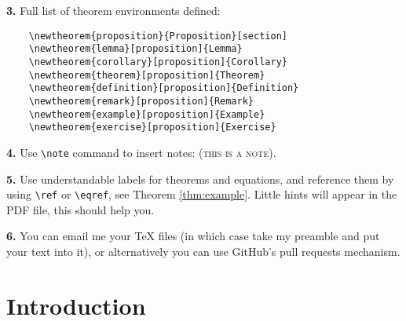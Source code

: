 \documentclass[letterpaper,11pt,oneside,reqno]{amsart}
\numberwithin{equation}{section}
\newcommand{\note}[1]{\textsc{\color{blue}(#1)}}
\theoremstyle{definition}
\begin{document}
\textbf{3.} Full list of theorem environments defined:
\begin{lstlisting}
	\newtheorem{proposition}{Proposition}[section]
	\newtheorem{lemma}[proposition]{Lemma}
	\newtheorem{corollary}[proposition]{Corollary}
	\newtheorem{theorem}[proposition]{Theorem}
	\newtheorem{definition}[proposition]{Definition}
	\newtheorem{remark}[proposition]{Remark}
	\newtheorem{example}[proposition]{Example}
	\newtheorem{exercise}[proposition]{Exercise}	
\end{lstlisting}

\textbf{4.} Use \lstinline{\note} command to insert notes: \note{this is a note}.

\textbf{5.} Use understandable labels for theorems and equations, and reference them by using \lstinline{\ref}
or \lstinline{\eqref}, see Theorem \ref{thm:example}. Little hints will appear in the PDF file, 
this should help you.

\textbf{6.} You can email me your \TeX{} files (in which case take
my preamble and put your text into it), or alternatively you can use GitHub's pull requests mechanism.


\section{Introduction} %
\label{sec:introduction}










\end{document}
